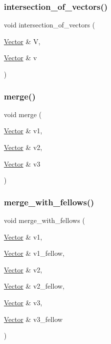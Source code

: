 \subsubsection{\texorpdfstring{intersection\+\_\+of\+\_\+vectors()}{intersection\_of\_vectors()}}
{\footnotesize\ttfamily void intersection\+\_\+of\+\_\+vectors (\begin{DoxyParamCaption}\item[{\mbox{\hyperlink{class_vector}{Vector}} \&}]{V,  }\item[{\mbox{\hyperlink{class_vector}{Vector}} \&}]{v }\end{DoxyParamCaption})}

\mbox{\label{vector_8_c_a310cecde8237fbd947415a851ec9d863}} 
\subsubsection{\texorpdfstring{merge()}{merge()}}
{\footnotesize\ttfamily void merge (\begin{DoxyParamCaption}\item[{\mbox{\hyperlink{class_vector}{Vector}} \&}]{v1,  }\item[{\mbox{\hyperlink{class_vector}{Vector}} \&}]{v2,  }\item[{\mbox{\hyperlink{class_vector}{Vector}} \&}]{v3 }\end{DoxyParamCaption})}

\mbox{\label{vector_8_c_ad0c537ed72189444f04920bd1ec09452}} 
\subsubsection{\texorpdfstring{merge\+\_\+with\+\_\+fellows()}{merge\_with\_fellows()}}
{\footnotesize\ttfamily void merge\+\_\+with\+\_\+fellows (\begin{DoxyParamCaption}\item[{\mbox{\hyperlink{class_vector}{Vector}} \&}]{v1,  }\item[{\mbox{\hyperlink{class_vector}{Vector}} \&}]{v1\+\_\+fellow,  }\item[{\mbox{\hyperlink{class_vector}{Vector}} \&}]{v2,  }\item[{\mbox{\hyperlink{class_vector}{Vector}} \&}]{v2\+\_\+fellow,  }\item[{\mbox{\hyperlink{class_vector}{Vector}} \&}]{v3,  }\item[{\mbox{\hyperlink{class_vector}{Vector}} \&}]{v3\+\_\+fellow }\end{DoxyParamCaption})}

